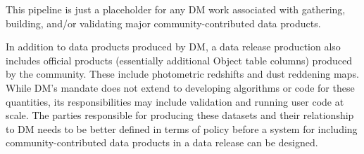 This pipeline is just a placeholder for any DM work associated with gathering, building, and/or validating major community-contributed data products.

In addition to data products produced by DM, a data release production also includes official products (essentially additional Object table columns) produced by the community.  These include photometric redshifts and dust reddening maps.  While DM's mandate does not extend to developing algorithms or code for these quantities, its responsibilities may include validation and running user code at scale.  The parties responsible for producing these datasets and their relationship to DM needs to be better defined in terms of policy before a system for including community-contributed data products in a data release can be designed.
